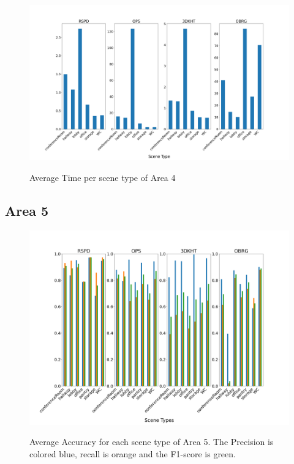 \documentclass[main.tex]{subfiles}
\begin{document}
\begin{figure}[H]
    \centering
    \includegraphics[width=15 cm]{images/area_4_time.png}
    \label{fig:area4T}
    \caption[Times Area 4]{Average Time per scene type of Area 4}
\end{figure}


\subsection{Area 5}

\begin{figure}[H]
    \centering
    \includegraphics[width=15 cm]{images/area_5_acc.png}
    \label{fig:area5A}
    \caption[Accuracies Area 4]{Average Accuracy for each scene type of Area 5. The Precision
        is colored blue, recall is orange and the F1-score is green. }
\end{figure}
\end{document}
